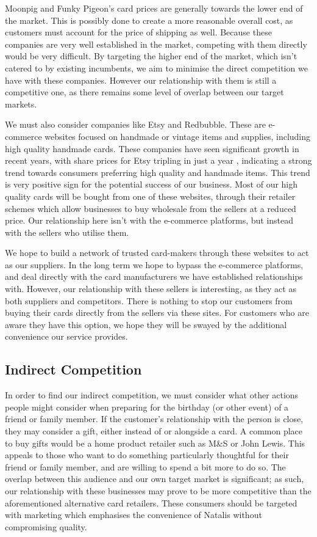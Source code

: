 \documentclass[10pt,a4paper]{article}
\begin{document}
Moonpig and Funky Pigeon's card prices are generally towards the lower end of the market. This is possibly done to create a more reasonable overall cost, as customers must account for the price of shipping as well. Because these companies are very well established in the market, competing with them directly would be very difficult. By targeting the higher end of the market, which isn't catered to by existing incumbents, we aim to minimise the direct competition we have with these companies. However our relationship with them is still a competitive one, as there remains some level of overlap between our target markets.

We must also consider companies like Etsy and Redbubble. These are e-commerce websites focused on handmade or vintage items and supplies, including high quality handmade cards. These companies have seen significant growth in recent years, with share prices for Etsy tripling in just a year \citep{etsyshares}, indicating a strong trend towards consumers preferring high quality and handmade items. This trend is very positive sign for the potential success of our business. Most of our high quality cards will be bought from one of these websites, through their retailer schemes which allow businesses to buy wholesale from the sellers at a reduced price. Our relationship here isn't with the e-commerce platforms, but instead with the sellers who utilise them.

We hope to build a network of trusted card-makers through these websites to act as our suppliers. In the long term we hope to bypass the e-commerce platforms, and deal directly with the card manufacturers we have established relationships with. However, our relationship with these sellers is interesting, as they act as both suppliers and competitors. There is nothing to stop our customers from buying their cards directly from the sellers via these sites. For customers who are aware they have this option, we hope they will be swayed by the additional convenience our service provides.

\subsection*{Indirect Competition}

In order to find our indirect competition, we must consider what other actions people might consider when preparing for the birthday (or other event) of a friend or family member. If the customer's relationship with the person is close, they may consider a gift, either instead of or alongside a card. A common place to buy gifts would be a home product retailer such as M\&S or John Lewis. This appeals to those who want to do something particularly thoughtful for their friend or family member, and are willing to spend a bit more to do so. The overlap between this audience and our own target market is significant; as such, our relationship with these businesses may prove to be more competitive than the aforementioned alternative card retailers. These consumers should be targeted with marketing which emphasises the convenience of Natalis without compromising quality.
\end{document}
